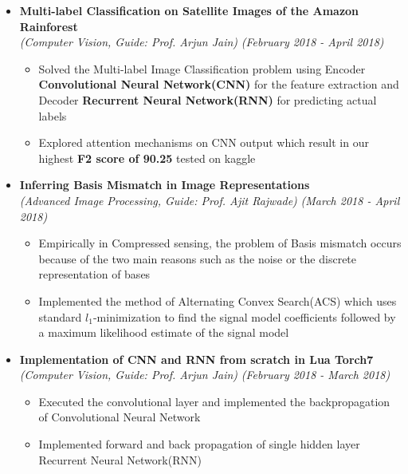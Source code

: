 \documentclass[a4paper,10pt]{article}
\newcommand{\isep}{-2 pt}
\begin{document}
\begin{itemize}

\item \textbf{Multi-label Classification on Satellite Images of the Amazon Rainforest} \\ \emph{(Computer Vision, Guide: Prof. Arjun Jain)} \hfill {\emph{(February 2018 - April 2018)}}
    \\ [-0.6cm]
    \begin{itemize}\itemsep \isep
    \item Solved the Multi-label Image Classification problem using Encoder \textbf{Convolutional Neural Network(CNN)} for the feature extraction and Decoder \textbf{Recurrent Neural Network(RNN)} for predicting actual labels
    \item Explored attention mechanisms on CNN output which result in our highest \textbf{F2 score of 90.25} tested on kaggle
    \end{itemize}

\item \textbf{Inferring Basis Mismatch in Image Representations} \\ {\emph{(Advanced Image Processing, Guide: Prof. Ajit Rajwade)}} \hfill {\emph{(March 2018 - April 2018)}}
    \\ [-0.6cm]
    \begin{itemize}\itemsep \isep
    \item Empirically in Compressed sensing, the problem of Basis mismatch occurs because of the two main reasons such as the noise or the discrete representation of bases 
    \item Implemented the method of Alternating Convex Search(ACS) which uses standard $l_1$-minimization to find the signal model coefficients followed by a maximum likelihood estimate of the signal model
    \end{itemize}

\item \textbf{Implementation of CNN and RNN from scratch in Lua Torch7} \\
    {\emph{(Computer Vision, Guide: Prof. Arjun Jain)}} \hfill {\emph{(February 2018 - March 2018)}}
    \\ [-0.6cm]
    \begin{itemize}\itemsep \isep
    \item Executed the convolutional layer and implemented the backpropagation of Convolutional Neural Network
    \item Implemented forward and back propagation of single hidden layer Recurrent Neural Network(RNN)
	\end{itemize}


\end{itemize}
\end{document}
